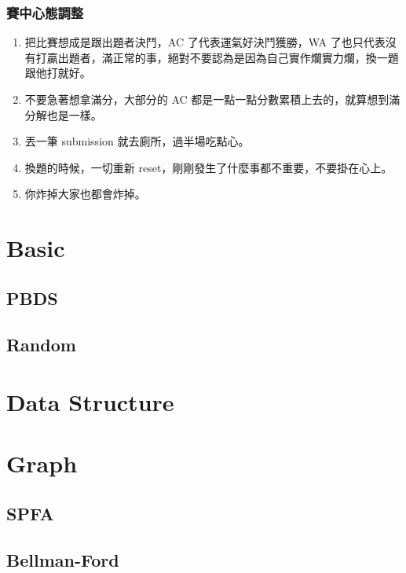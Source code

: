 \documentclass[twocolumn]{article}
\begin{document}
\subsubsection{賽中心態調整}
\begin{enumerate}
    \item 把比賽想成是跟出題者決鬥，AC 了代表運氣好決鬥獲勝，WA 了也只代表沒有打贏出題者，滿正常的事，絕對不要認為是因為自己實作爛實力爛，換一題跟他打就好。
    \item 不要急著想拿滿分，大部分的 AC 都是一點一點分數累積上去的，就算想到滿分解也是一樣。
    \item 丟一筆 submission 就去廁所，過半場吃點心。
    \item 換題的時候，一切重新 reset，剛剛發生了什麼事都不重要，不要掛在心上。
    \item 你炸掉大家也都會炸掉。
\end{enumerate}

\newpage

\section{Basic}


\subsection{PBDS}


\subsection{Random}


\section{Data Structure}

\section{Graph}

\subsection{SPFA}


\subsection{Bellman-Ford}

\end{document}
